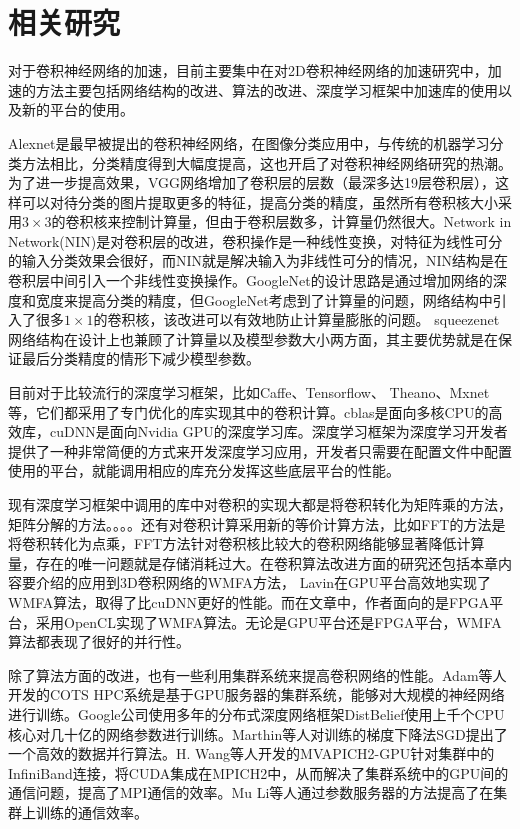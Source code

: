 \section{相关研究}
对于卷积神经网络的加速，目前主要集中在对2D卷积神经网络的加速研究中，加速的方法主要包括网络结构的改进、算法的改进、深度学习框架中加速库的使用以及新的平台的使用。

Alexnet是最早被提出的卷积神经网络，在图像分类应用中，与传统的机器学习分类方法\upcite{}相比，分类精度得到大幅度提高，这也开启了对卷积神经网络研究的热潮。为了进一步提高效果，VGG网络增加了卷积层的层数（最深多达19层卷积层），这样可以对待分类的图片提取更多的特征，提高分类的精度，虽然所有卷积核大小采用$3\times 3$的卷积核来控制计算量，但由于卷积层数多，计算量仍然很大。Network in Network(NIN)是对卷积层的改进，卷积操作是一种线性变换，对特征为线性可分的输入分类效果会很好，而NIN就是解决输入为非线性可分的情况，NIN结构是在卷积层中间引入一个非线性变换操作。GoogleNet的设计思路是通过增加网络的深度和宽度来提高分类的精度，但GoogleNet考虑到了计算量的问题，网络结构中引入了很多$1\times 1$的卷积核，该改进可以有效地防止计算量膨胀的问题。 squeezenet网络结构在设计上也兼顾了计算量以及模型参数大小两方面，其主要优势就是在保证最后分类精度的情形下减少模型参数。

目前对于比较流行的深度学习框架，比如Caffe、Tensorflow、
Theano、Mxnet等，它们都采用了专门优化的库实现其中的卷积计算。cblas是面向多核CPU的高效库，cuDNN是面向Nvidia GPU的深度学习库。深度学习框架为深度学习开发者提供了一种非常简便的方式来开发深度学习应用，开发者只需要在配置文件中配置使用的平台，就能调用相应的库充分发挥这些底层平台的性能。

现有深度学习框架中调用的库中对卷积的实现大都是将卷积转化为矩阵乘的方法，矩阵分解的方法。。。。还有对卷积计算采用新的等价计算方法，比如FFT的方法是将卷积转化为点乘，FFT方法针对卷积核比较大的卷积网络能够显著降低计算量，存在的唯一问题就是存储消耗过大。在卷积算法改进方面的研究还包括本章内容要介绍的应用到3D卷积网络的WMFA方法， Lavin在GPU平台高效地实现了WMFA算法，取得了比cuDNN更好的性能。而在文章中，作者面向的是FPGA平台，采用OpenCL实现了WMFA算法。无论是GPU平台还是FPGA平台，WMFA算法都表现了很好的并行性。

除了算法方面的改进，也有一些利用集群系统来提高卷积网络的性能。Adam等人开发的COTS HPC系统是基于GPU服务器的集群系统，能够对大规模的神经网络进行训练。Google公司使用多年的分布式深度网络框架DistBelief使用上千个CPU核心对几十亿的网络参数进行训练。Marthin等人对训练的梯度下降法SGD提出了一个高效的数据并行算法。H. Wang等人开发的MVAPICH2-GPU针对集群中的InfiniBand连接，将CUDA集成在MPICH2中，从而解决了集群系统中的GPU间的通信问题，提高了MPI通信的效率。Mu Li等人通过参数服务器的方法提高了在集群上训练的通信效率。

